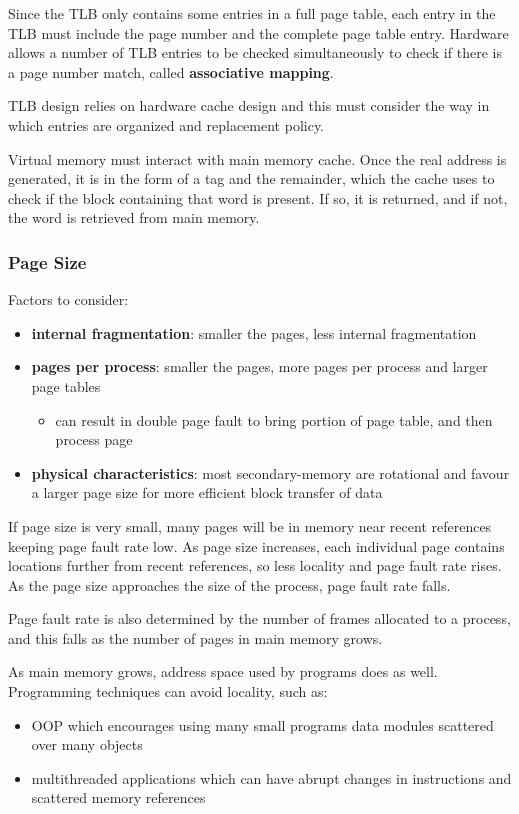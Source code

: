 \documentclass[11pt]{article}
\begin{document}
Since the TLB only contains some entries in a full page table, each entry in the TLB
must include the page number and the complete page table entry.
Hardware allows a number of TLB entries to be checked simultaneously to check if there
is a page number match, called \textbf{associative mapping}.

TLB design relies on hardware cache design and this must consider the way in which
entries are organized and replacement policy.

Virtual memory must interact with main memory cache.
Once the real address is generated, it is in the form of a tag and the remainder,
which the cache uses to check if the block containing that word is present.
If so, it is returned, and if not, the word is retrieved from main memory.
\subsubsection{Page Size}
\label{sec:orgdbcbc58}
Factors to consider:
\begin{itemize}
\item \textbf{internal fragmentation}: smaller the pages, less internal fragmentation
\item \textbf{pages per process}: smaller the pages, more pages per process and larger page
tables
\begin{itemize}
\item can result in double page fault to bring portion of page table, and then process page
\end{itemize}
\item \textbf{physical characteristics}: most secondary-memory are rotational and favour a larger
page size for more efficient block transfer of data
\end{itemize}

If page size is very small, many pages will be in memory near recent references keeping
page fault rate low.
As page size increases, each individual page contains locations further from recent
references, so less locality and page fault rate rises.
As the page size approaches the size of the process, page fault rate falls.

Page fault rate is also determined by the number of frames allocated to a process,
and this falls as the number of pages in main memory grows.

As main memory grows, address space used by programs does as well.
Programming techniques can avoid locality, such as:
\begin{itemize}
\item OOP which encourages using many small programs data modules scattered over
many objects
\item multithreaded applications which can have abrupt changes in instructions and
scattered memory references
\end{itemize}
\end{document}
